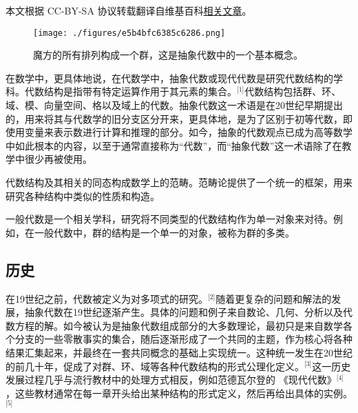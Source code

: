 
本文根据 CC-BY-SA 协议转载翻译自维基百科\href{https://en.wikipedia.org/wiki/Abstract_algebra}{相关文章}。

\begin{figure}[ht]
\centering
\texttt{[image: ./figures/e5b4bfc6385c6286.png]}
\caption{魔方的所有排列构成一个群，这是抽象代数中的一个基本概念。} \label{fig_CXds_1}
\end{figure}
在数学中，更具体地说，在代数学中，抽象代数或现代代数是研究代数结构的学科。代数结构是指带有特定运算作用于其元素的集合。\(^\text{[1]}\)代数结构包括群、环、域、模、向量空间、格以及域上的代数。抽象代数这一术语是在20世纪早期提出的，用来将其与代数学的旧分支区分开来，更具体地，是为了区别于初等代数，即使用变量来表示数进行计算和推理的部分。如今，抽象的代数观点已成为高等数学中如此根本的内容，以至于通常直接称为“代数”，而“抽象代数”这一术语除了在教学中很少再被使用。

代数结构及其相关的同态构成数学上的范畴。范畴论提供了一个统一的框架，用来研究各种结构中类似的性质和构造。

一般代数是一个相关学科，研究将不同类型的代数结构作为单一对象来对待。例如，在一般代数中，群的结构是一个单一的对象，被称为群的多类。
\subsection{历史}
在19世纪之前，代数被定义为对多项式的研究。\(^\text{[2]}\)随着更复杂的问题和解法的发展，抽象代数在19世纪逐渐产生。具体的问题和例子来自数论、几何、分析以及代数方程的解。如今被认为是抽象代数组成部分的大多数理论，最初只是来自数学各个分支的一些零散事实的集合，随后逐渐形成了一个共同的主题，作为核心将各种结果汇集起来，并最终在一套共同概念的基础上实现统一。这种统一发生在20世纪的前几十年，促成了对群、环、域等各种代数结构的形式公理化定义。\(^\text{[3]}\)这一历史发展过程几乎与流行教材中的处理方式相反，例如范德瓦尔登的 《现代代数》\(^\text{[4]}\)，这些教材通常在每一章开头给出某种结构的形式定义，然后再给出具体的实例。\(^\text{[5]}\)
